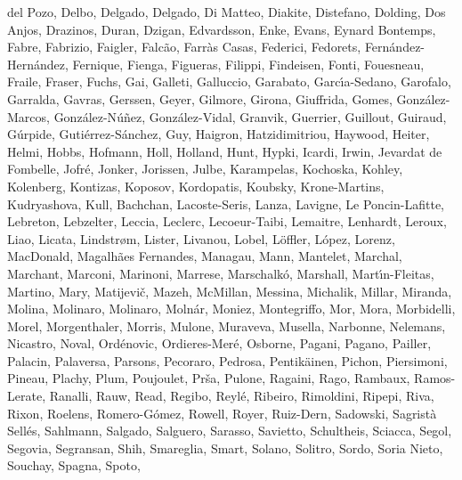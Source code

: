 \documentclass{aa}
\begin{document}
\begin{thebibliography}{242}
{  {del Pozo}, {Delbo}, {Delgado}, {Delgado}, {Di Matteo}, {Diakite},
  {Distefano}, {Dolding}, {Dos Anjos}, {Drazinos}, {Duran}, {Dzigan},
  {Edvardsson}, {Enke}, {Evans}, {Eynard Bontemps}, {Fabre}, {Fabrizio},
  {Faigler}, {Falc{\~a}o}, {Farr{\`a}s Casas}, {Federici}, {Fedorets},
  {Fern{\'a}ndez-Hern{\'a}ndez}, {Fernique}, {Fienga}, {Figueras}, {Filippi},
  {Findeisen}, {Fonti}, {Fouesneau}, {Fraile}, {Fraser}, {Fuchs}, {Gai},
  {Galleti}, {Galluccio}, {Garabato}, {Garc{\'{\i}}a-Sedano}, {Garofalo},
  {Garralda}, {Gavras}, {Gerssen}, {Geyer}, {Gilmore}, {Girona}, {Giuffrida},
  {Gomes}, {Gonz{\'a}lez-Marcos}, {Gonz{\'a}lez-N{\'u}{\~n}ez},
  {Gonz{\'a}lez-Vidal}, {Granvik}, {Guerrier}, {Guillout}, {Guiraud},
  {G{\'u}rpide}, {Guti{\'e}rrez-S{\'a}nchez}, {Guy}, {Haigron},
  {Hatzidimitriou}, {Haywood}, {Heiter}, {Helmi}, {Hobbs}, {Hofmann}, {Holl},
  {Holland}, {Hunt}, {Hypki}, {Icardi}, {Irwin}, {Jevardat de Fombelle},
  {Jofr{\'e}}, {Jonker}, {Jorissen}, {Julbe}, {Karampelas}, {Kochoska},
  {Kohley}, {Kolenberg}, {Kontizas}, {Koposov}, {Kordopatis}, {Koubsky},
  {Krone-Martins}, {Kudryashova}, {Kull}, {Bachchan}, {Lacoste-Seris}, {Lanza},
  {Lavigne}, {Le Poncin-Lafitte}, {Lebreton}, {Lebzelter}, {Leccia}, {Leclerc},
  {Lecoeur-Taibi}, {Lemaitre}, {Lenhardt}, {Leroux}, {Liao}, {Licata},
  {Lindstr{\o}m}, {Lister}, {Livanou}, {Lobel}, {L{\"o}ffler}, {L{\'o}pez},
  {Lorenz}, {MacDonald}, {Magalh{\~a}es Fernandes}, {Managau}, {Mann},
  {Mantelet}, {Marchal}, {Marchant}, {Marconi}, {Marinoni}, {Marrese},
  {Marschalk{\'o}}, {Marshall}, {Mart{\'{\i}}n-Fleitas}, {Martino}, {Mary},
  {Matijevi{\v c}}, {Mazeh}, {McMillan}, {Messina}, {Michalik}, {Millar},
  {Miranda}, {Molina}, {Molinaro}, {Molinaro}, {Moln{\'a}r}, {Moniez},
  {Montegriffo}, {Mor}, {Mora}, {Morbidelli}, {Morel}, {Morgenthaler},
  {Morris}, {Mulone}, {Muraveva}, {Musella}, {Narbonne}, {Nelemans},
  {Nicastro}, {Noval}, {Ord{\'e}novic}, {Ordieres-Mer{\'e}}, {Osborne},
  {Pagani}, {Pagano}, {Pailler}, {Palacin}, {Palaversa}, {Parsons}, {Pecoraro},
  {Pedrosa}, {Pentik{\"a}inen}, {Pichon}, {Piersimoni}, {Pineau}, {Plachy},
  {Plum}, {Poujoulet}, {Pr{\v s}a}, {Pulone}, {Ragaini}, {Rago}, {Rambaux},
  {Ramos-Lerate}, {Ranalli}, {Rauw}, {Read}, {Regibo}, {Reyl{\'e}}, {Ribeiro},
  {Rimoldini}, {Ripepi}, {Riva}, {Rixon}, {Roelens}, {Romero-G{\'o}mez},
  {Rowell}, {Royer}, {Ruiz-Dern}, {Sadowski}, {Sagrist{\`a} Sell{\'e}s},
  {Sahlmann}, {Salgado}, {Salguero}, {Sarasso}, {Savietto}, {Schultheis},
  {Sciacca}, {Segol}, {Segovia}, {Segransan}, {Shih}, {Smareglia}, {Smart},
  {Solano}, {Solitro}, {Sordo}, {Soria Nieto}, {Souchay}, {Spagna}, {Spoto},
}
\end{thebibliography}
\end{document}
